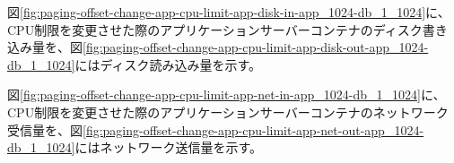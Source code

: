 \documentclass[../../../../main]{subfiles}
\begin{document}

    図\ref{fig:paging-offset-change-app-cpu-limit-app-disk-in-app_1024-db_1_1024}に、CPU制限を変更させた際のアプリケーションサーバーコンテナのディスク書き込み量を、図\ref{fig:paging-offset-change-app-cpu-limit-app-disk-out-app_1024-db_1_1024}にはディスク読み込み量を示す。

    
    


    図\ref{fig:paging-offset-change-app-cpu-limit-app-net-in-app_1024-db_1_1024}に、CPU制限を変更させた際のアプリケーションサーバーコンテナのネットワーク受信量を、図\ref{fig:paging-offset-change-app-cpu-limit-app-net-out-app_1024-db_1_1024}にはネットワーク送信量を示す。

    
    
\end{document}
